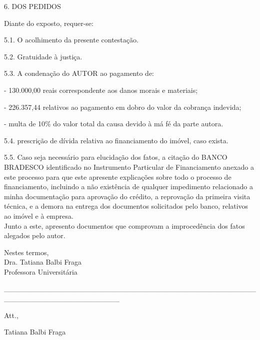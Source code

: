 \documentclass[11pt]{letter}
\begin{document}
6. DOS PEDIDOS

Diante do exposto, requer-se:

5.1. O acolhimento da presente contestação. 

5.2. Gratuidade à justiça.

5.3. A condenação do AUTOR ao pagamento de:

	- 130.000,00 reais correspondente aos danos morais e materiais;
	
	- 226.357,44 relativos ao pagamento em dobro do valor da cobrança indevida;
	
	- multa de 10\% do valor total da causa devido à má fé da parte autora. 
	
5.4. prescrição de dívida relativa ao financiamento do imóvel, caso exista.
	
5.5. Caso seja necessário para elucidação dos fatos, a citação do BANCO BRADESCO identificado no Instrumento Particular de Financiamento anexado a este processo para que este apresente explicações sobre todo o processo de financiamento, incluindo a não existência de qualquer impedimento relacionado a minha documentação para aprovação do crédito, a reprovação da primeira visita técnica, e a demora na entrega dos documentos solicitados pelo banco, relativos ao imóvel e à empresa.  \\

	
Junto a este, apresento documentos que comprovam a improcedência dos fatos alegados pelo autor.

Nestes termos, \\
Dra. Tatiana Balbi Fraga \\
Professora Universitária

\begin{center}
             \_\_\_\_\_\_\_\_\_\_\_\_\_\_\_\_\_\_\_\_\_\_\_\_\_\_\_\_\_\_\_\_\_\_\_\_\_\_\_\_\_\_\_\_\_\_\_\_\_\_\_\_\_\_\_\_\_\_\_\_\_\_\_\_\_\_\_\_\_\_
    
\end{center}  
          
Att.,

Tatiana Balbi Fraga










\end{document}
